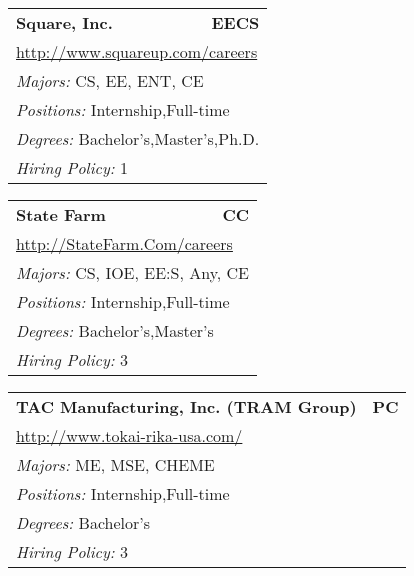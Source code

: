 \documentclass[twoside]{article}
\begin{document}
\begin{center}
\begin{multicols}{3}
\begin{FlushLeft}
\begin{minipage}{.9\columnwidth}
\end{minipage}
 
\begin{minipage}{.9\columnwidth}\begin{tabularx}{.95\columnwidth}{Xr}
                 {\Large\bf Square, Inc.} & {\Large\bf EECS}\\
    \multicolumn{2}{p{.95\columnwidth}}{\url{http://www.squareup.com/careers}}\\
    \multicolumn{2}{p{.95\columnwidth}}{\emph{Majors:} CS, EE, ENT, CE}\\
    \multicolumn{2}{p{.95\columnwidth}}{\emph{Positions:} Internship,Full-time}\\
    \multicolumn{2}{p{.95\columnwidth}}{\emph{Degrees:} Bachelor's,Master's,Ph.D.}\\
    \multicolumn{2}{p{.95\columnwidth}}{\emph{Hiring Policy:} 1}\\
    \end{tabularx}
    
\end{minipage}
 
\begin{minipage}{.9\columnwidth}\begin{tabularx}{.95\columnwidth}{Xr}
                 {\Large\bf State Farm} & {\Large\bf CC}\\
    \multicolumn{2}{p{.95\columnwidth}}{\url{http://StateFarm.Com/careers}}\\
    \multicolumn{2}{p{.95\columnwidth}}{\emph{Majors:} CS, IOE, EE:S, Any, CE}\\
    \multicolumn{2}{p{.95\columnwidth}}{\emph{Positions:} Internship,Full-time}\\
    \multicolumn{2}{p{.95\columnwidth}}{\emph{Degrees:} Bachelor's,Master's}\\
    \multicolumn{2}{p{.95\columnwidth}}{\emph{Hiring Policy:} 3}\\
    \end{tabularx}
    
\end{minipage}
 
\begin{minipage}{.9\columnwidth}\begin{tabularx}{.95\columnwidth}{Xr}
                 {\Large\bf TAC Manufacturing, Inc. (TRAM Group)} & {\Large\bf PC}\\
    \multicolumn{2}{p{.95\columnwidth}}{\url{http://www.tokai-rika-usa.com/}}\\
    \multicolumn{2}{p{.95\columnwidth}}{\emph{Majors:} ME, MSE, CHEME}\\
    \multicolumn{2}{p{.95\columnwidth}}{\emph{Positions:} Internship,Full-time}\\
    \multicolumn{2}{p{.95\columnwidth}}{\emph{Degrees:} Bachelor's}\\
    \multicolumn{2}{p{.95\columnwidth}}{\emph{Hiring Policy:} 3}\\
    \end{tabularx}
    

\end{minipage}
\end{FlushLeft}
\end{multicols}
\end{center}
\end{document}
